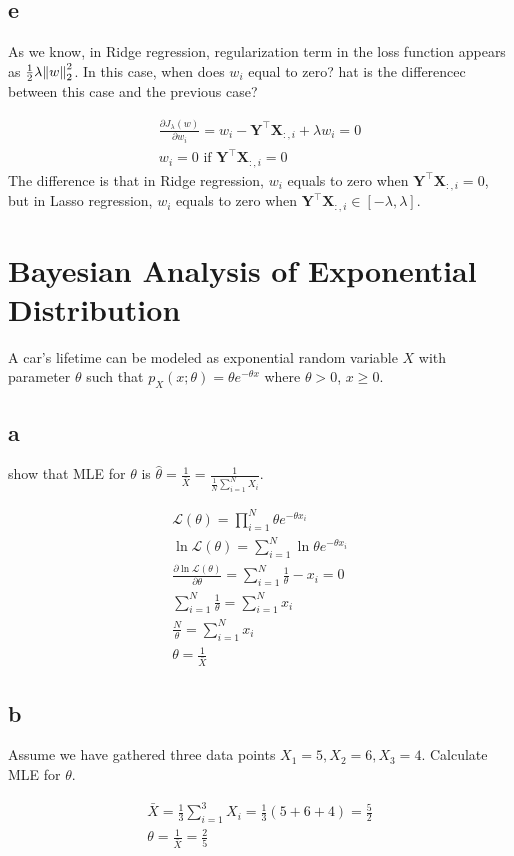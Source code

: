 \documentclass[12pt]{article}
\begin{document}
\subsection{e}
As we know, in Ridge regression, regularization term in the loss function appears as $\frac{1}{2} \lambda \norm{w}_{2}^{2}$. In this case, when does $w_i$ equal to zero? hat is the differencec between this case and the previous case?
\begin{qsolve}
    \begin{gather*}
        \frac{\partial J_{\lambda}(w)}{\partial w_i} = w_i - \mathbf{Y}^\top \mathbf{X}_{:,i} + \lambda w_i = 0\\
        w_i = 0 \text{ if } \mathbf{Y}^\top \mathbf{X}_{:,i} = 0
    \end{gather*}
    The difference is that in Ridge regression, $w_i$ equals to zero when $\mathbf{Y}^\top \mathbf{X}_{:,i} = 0$, but in Lasso regression, $w_i$ equals to zero when $\mathbf{Y}^\top \mathbf{X}_{:,i} \in [-\lambda, \lambda]$.
\end{qsolve}
\clearpage
\section{Bayesian Analysis of Exponential Distribution}
A car’s lifetime can be modeled as exponential random variable $X$ with parameter $\theta$ such that $p_X(x;\theta) = \theta e^{-\theta x}$ where $\theta > 0$, $x \geq 0$.
\subsection{a}
show that MLE for $\theta$ is $\hat{\theta} = \frac{1}{\bar{X}} = \frac{1}{\frac{1}{N} \sum_{i=1}^{N} X_i}$.
\begin{qsolve}
    \begin{gather*}
        \mathcal{L}(\theta) = \prod_{i=1}^{N} \theta e^{-\theta x_i}\\
        \ln \mathcal{L}(\theta) = \sum_{i=1}^{N} \ln \theta e^{-\theta x_i}\\
        \frac{\partial \ln \mathcal{L}(\theta)}{\partial \theta} = \sum_{i=1}^{N} \frac{1}{\theta} - x_i = 0\\
        \sum_{i=1}^{N} \frac{1}{\theta} = \sum_{i=1}^{N} x_i\\
        \frac{N}{\theta} = \sum_{i=1}^{N} x_i\\
        \theta = \frac{1}{\bar{X}}
    \end{gather*}
\end{qsolve}
\subsection{b}
Assume we have gathered three data points $X_1 = 5 , X_2= 6 , X_3 = 4$. Calculate MLE for $\theta$.
\begin{qsolve}
    \begin{gather*}
        \bar{X} = \frac{1}{3} \sum_{i=1}^{3} X_i = \frac{1}{3} (5 + 6 + 4) = \frac{5}{2}\\
        \theta = \frac{1}{\bar{X}} = \frac{2}{5}
    \end{gather*}
\end{qsolve}
\end{document}
